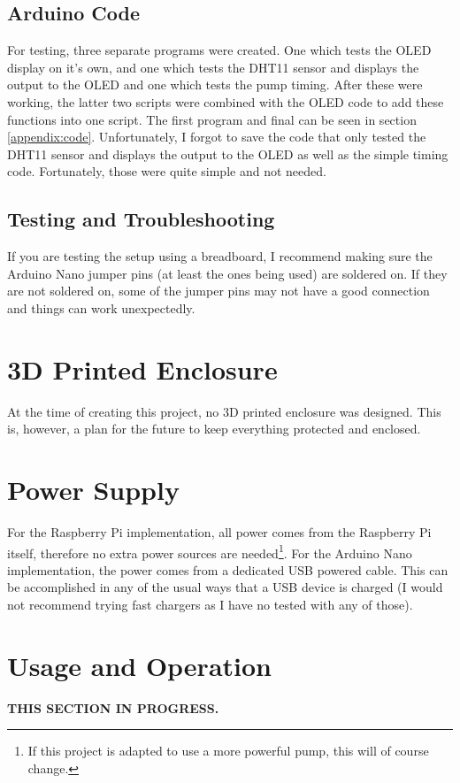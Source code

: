 \documentclass{article}
\begin{document}
\begin{multicols}{2}
		\subsection{Arduino Code}
		For testing, three separate programs were created. One which tests the OLED display on it's own, and one which tests the DHT11 sensor and displays the output to the OLED and one which tests the pump timing. After these were working, the latter two scripts were combined with the OLED code to add these functions into one script. The first program and final can be seen in section \ref{appendix:code}. Unfortunately, I forgot to save the code that only tested the DHT11 sensor and displays the output to the OLED as well as the simple timing code. Fortunately, those were quite simple and not needed.
		
		\subsection{Testing and Troubleshooting}
		If you are testing the setup using a breadboard, I recommend making sure the Arduino Nano jumper pins (at least the ones being used) are soldered on. If they are not soldered on, some of the jumper pins may not have a good connection and things can work unexpectedly.
		
		\section{3D Printed Enclosure}
		At the time of creating this project, no 3D printed enclosure was designed. This is, however, a plan for the future to keep everything protected and enclosed.
		
		\section{Power Supply}
		For the Raspberry Pi implementation, all power comes from the Raspberry Pi itself, therefore no extra power sources are needed\footnote{If this project is adapted to use a more powerful pump, this will of course change.}. For the Arduino Nano implementation, the power comes from a dedicated USB powered cable. This can be accomplished in any of the usual ways that a USB device is charged (I would not recommend trying fast chargers as I have no tested with any of those).
		
		\section{Usage and Operation}
		\textbf{THIS SECTION IN PROGRESS.}
		

\end{multicols}
\end{document}
